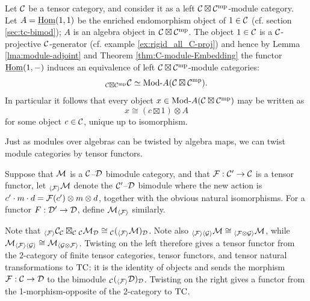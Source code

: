 \documentclass{amsart}
\begin{document}
\begin{example} \label{Ex:Hopf_bimod} 
	Let $\mathcal C$ be a tensor category, and consider it as a left $\mathcal C \boxtimes \mathcal C^{\mathrm{mp}}$-module category. Let $A = \operatorname{\underline{Hom}}(1,1)$ be the enriched endomorphism object of $1 \in \mathcal C$ (cf. section \ref{sec:tc-bimod}); $A$ is an algebra object in $\mathcal C \boxtimes \mathcal C^{\mathrm{mp}}$. 
The object $1 \in \mathcal C$ is a $\mathcal C$-projective $\mathcal C$-generator (cf. example \ref{ex:rigid_all_C-proj}) and hence by Lemma \ref{lma:module-adjoint} and Theorem \ref{thm:C-module-Embedding} the functor $\operatorname{\underline{Hom}}(1, -)$ induces an 
 equivalence of left $\mathcal C \boxtimes \mathcal C^{\mathrm{mp}}$-module categories:
	\begin{equation*}
		{}_{\cC \boxtimes \cC^\mp} \cC \simeq \Mod{}{A}(\cC \boxtimes \cC^\mp).
	\end{equation*} 
In particular it follows that every object $x \in \Mod{}{A}(\cC \boxtimes \cC^\mp)$ may be written as 
\begin{equation*}
	x \cong (c \boxtimes 1) \otimes A
\end{equation*}
for some object $c \in \mathcal C$, unique up to isomorphism. 
\end{example}

Just as modules over algebras can be twisted by algebra maps, we can twist module categories by tensor functors.

\begin{definition}
Suppose that $\mathcal M$ is a $\mathcal C$--$\mathcal D$ bimodule category, and that $\mathcal F: \mathcal C' \rightarrow \mathcal C$ is a tensor functor, let
${}_{\langle \mathcal F \rangle} \mathcal M$ denote the $\mathcal C'$--$\mathcal D$ bimodule where the new action is $c' \cdot m \cdot d = \mathcal F(c') \otimes m \otimes d$, together with the obvious natural isomorphisms.  For a functor $F: \mathcal D' \rightarrow \mathcal D$, define $\mathcal M_{\langle \mathcal F \rangle}$ similarly.
\end{definition}

Note that ${}_{\langle \mathcal F \rangle} \mathcal C_\mathcal C \boxtimes_{\mathcal C} {}_{\mathcal C} \mathcal M_\mathcal D \cong {}_{\mathcal C} ({}_{\langle \mathcal F \rangle} \mathcal M)_\mathcal D$.  Note also ${}_{\langle \mathcal F \rangle \langle \mathcal G \rangle} \mathcal M \cong {}_{\langle \mathcal F \otimes \mathcal G \rangle} \mathcal M$, while $\mathcal M_{\langle \mathcal F \rangle \langle \mathcal G \rangle} \cong  \mathcal M_{\langle \mathcal G \otimes \mathcal F \rangle}$.  Twisting on the left therefore gives a tensor functor from the $2$-category of finite tensor categories, tensor functors, and tensor natural transformations to $\mathrm{TC}$: it is the identity of objects and sends the morphism $\mathcal F: \mathcal C \rightarrow \mathcal D$ to the bimodule ${}_{\mathcal C} ({}_{\langle \mathcal F \rangle} \mathcal D)_{\mathcal D}$.  Twisting on the right gives a functor from the 1-morphism-opposite of the $2$-category to $\mathrm{TC}$.
\end{document}
